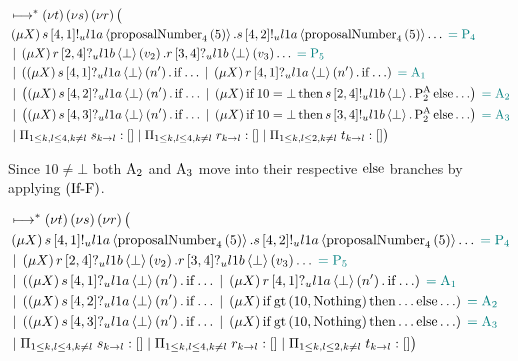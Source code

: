 \begin{align*}
&\mapstostar
\NuChannels \big (\\
&\Mu{X} \SendUnreliableP{s}{4}{1}{\LOneA}{\proposalNumber{5}{4}}.\SendUnreliableP{s}{4}{2}{\LOneA}{\proposalNumber{5}{4}}\dots \comment{= \Proposer{4}}\\
&\Or \Mu{X} \ReceiveUnreliableP{r}{2}{4}{\LOneB}{\bot}{v_2}.\ReceiveUnreliableP{r}{3}{4}{\LOneB}{\bot}{v_3}\dots \comment{= \Proposer{5}}\\
&\Or \Paren{
    \Mu{X} \ReceiveUnreliableP{s}{4}{1}{\LOneA}{\bot}{n'}.\If{\dots}
    \Or \Mu{X} \ReceiveUnreliableP{r}{4}{1}{\LOneA}{\bot}{n'}.\If{\dots}
} \comment{=\Acceptor{1}}\\
&\Or \Paren{
    \Mu{X} \ReceiveUnreliableP{s}{4}{2}{\LOneA}{\bot}{n'}.\If{\dots}
    \Or \Mu{X} \If{10 = \bot} \Then{\SendUnreliableP{s}{2}{4}{\LOneB}{\bot}.\PaTwo} \Else{\dots}
} \comment{=\Acceptor{2}}\\
&\Or \Paren{
    \Mu{X} \ReceiveUnreliableP{s}{4}{3}{\LOneA}{\bot}{n'}.\If{\dots}
    \Or \Mu{X} \If{10 = \bot} \Then{\SendUnreliableP{s}{3}{4}{\LOneB}{\bot}.\PaTwo} \Else{\dots}
} \comment{=\Acceptor{3}}\\
&\Or \InnerSessionQueues{s}
\Or \InnerSessionQueues{r}
\Or \OuterSessionQueues
\big )
\end{align*}

Since $10 \neq \bot$ both $\operatorname{A_{2}}$ and $\operatorname{A_{3}}$ move into their respective $\Else$ branches by applying $\left(\operatorname{If-F}\right)$.

\begin{align*}
&\mapstostar \NuChannels \big (\\
&\Mu{X} \SendUnreliableP{s}{4}{1}{\LOneA}{\proposalNumber{5}{4}}.\SendUnreliableP{s}{4}{2}{\LOneA}{\proposalNumber{5}{4}}\dots \comment{= \Proposer{4}}\\
&\Or \Mu{X} \ReceiveUnreliableP{r}{2}{4}{\LOneB}{\bot}{v_2}.\ReceiveUnreliableP{r}{3}{4}{\LOneB}{\bot}{v_3}\dots \comment{= \Proposer{5}}\\
&\Or \Paren{
    \Mu{X} \ReceiveUnreliableP{s}{4}{1}{\LOneA}{\bot}{n'}.\If{\dots}
    \Or \Mu{X} \ReceiveUnreliableP{r}{4}{1}{\LOneA}{\bot}{n'}.\If{\dots}
} \comment{=\Acceptor{1}}\\
&\Or \Paren{
    \Mu{X} \ReceiveUnreliableP{s}{4}{2}{\LOneA}{\bot}{n'}.\If{\dots}
    \Or \Mu{X} \If{\greaterThan{10}{\Nothing}} \Then{\dots} \Else{\dots}
} \comment{=\Acceptor{2}}\\
&\Or \Paren{
    \Mu{X} \ReceiveUnreliableP{s}{4}{3}{\LOneA}{\bot}{n'}.\If{\dots}
    \Or \Mu{X} \If{\greaterThan{10}{\Nothing}} \Then{\dots} \Else{\dots}
} \comment{=\Acceptor{3}}\\
&\Or \InnerSessionQueues{s}
\Or \InnerSessionQueues{r}
\Or \OuterSessionQueues
\big )
\end{align*}

